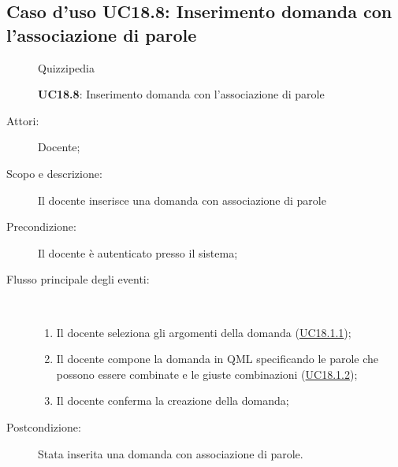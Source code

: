 \subsection{Caso d'uso UC18.8: Inserimento domanda con l'associazione di parole}
	\begin{figure}[H]
		\centering
		\begin{resizedtikzpicture}{\textwidth}
		\begin{umlsystem}[x=0, fill=lightgray!20]{Quizzipedia}
		\end{umlsystem}
		\end{resizedtikzpicture}
		\caption{\textbf{UC18.8}: Inserimento domanda con l'associazione di parole}
		\label{UC18.8}
	\end{figure}
\begin{description}
\item[Attori:] Docente;
\item[Scopo e descrizione:] Il docente inserisce una domanda con associazione di parole
      \item[Precondizione:] Il docente è autenticato presso il sistema;

        \item[Flusso principale degli eventi:] \ 
 \begin{enumerate}
          \item Il docente seleziona gli argomenti della domanda (\hyperlink{UC18.1.1}{UC18.1.1});
          \item Il docente compone la domanda in QML specificando le parole che possono essere combinate e le giuste combinazioni (\hyperlink{UC18.1.2}{UC18.1.2});
          \item Il docente conferma la creazione della domanda;

      \end{enumerate}
    \item[Postcondizione:] Stata inserita una domanda con associazione di parole.
  \end{description}
\hypertarget{UC18.9}{}
